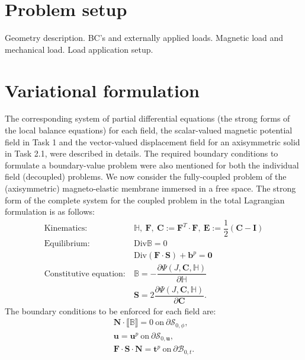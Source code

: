\documentclass[11pt,a4paper,final]{article}
\begin{document}
\section{Problem setup}
Geometry description. BC's and externally applied loads. Magnetic load and mechanical load. Load application setup. 

\section{Variational formulation}

The corresponding system of partial differential equations (the strong forms of the local balance equations) for each field, the scalar-valued magnetic potential field in Task 1 and the vector-valued displacement field for an axisymmetric solid in Task 2.1, were described in details. The required boundary conditions to formulate a boundary-value problem were also mentioned for both the individual field (decoupled) problems. We now consider the fully-coupled problem of the (axisymmetric) magneto-elastic membrane immersed in a free space. The strong form of the complete system for the coupled problem in the total Lagrangian formulation is as follows:
\begin{align}
\text{Kinematics}:& \ \mathbb{H}, \ \mathbf{F}, \ \mathbf{C} := \mathbf{F}^T \cdot \mathbf{F}, \ \mathbf{E} := \dfrac{1}{2} (\mathbf{C} - \mathbf{I}) \label{eq:3.22.1}\\
\text{Equilibrium}:& \ \text{Div} \mathbb{B} = 0 \label{eq:3.22.2}\\
& \ \text{Div}(\mathbf{F} \cdot \mathbf{S}) + \mathbf{b}^p = \mathbf{0} \label{eq:3.22.3}\\
\text{Constitutive equation}:& \ \mathbb{B} = -\dfrac{\partial \Psi (J, \mathbf{C}, \mathbb{H})}{\partial \mathbb{H}} \label{eq:3.22.4}\\
& \ \mathbf{S} = 2\dfrac{\partial \Psi (J, \mathbf{C}, \mathbb{H})}{\partial \mathbf{C}}.
\label{eq:3.22.5}
\end{align}
The boundary conditions to be enforced for each field are: 
\begin{align}
\mathbf{N} \cdot \llbracket \mathbb{B} \rrbracket = 0 \ \text{on} \ \partial \mathcal{S}_{0, \phi}, \label{eq:3.23.1}\\
\mathbf{u} = \mathbf{u}^p \ \text{on} \ \partial \mathcal{S}_{0, \mathbf{u}}, \label{eq:3.23.2}\\
\mathbf{F} \cdot \mathbf{S} \cdot \mathbf{N} = \mathbf{t}^p \ \text{on} \ \partial \mathcal{B}_{0, t}.
\label{eq:3.23.3}
\end{align}
\end{document}

